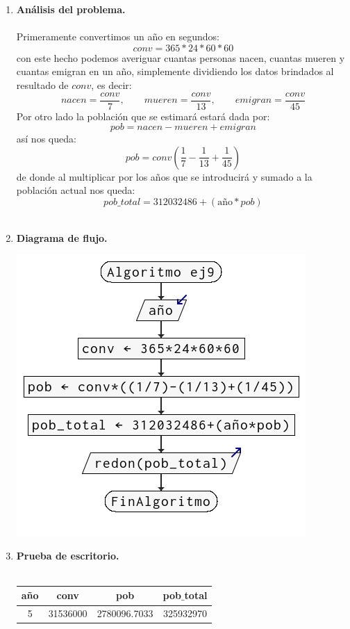 \begin{enumerate}
\begin{enumerate}[\bfseries a)]
    \item \textbf{Análisis del problema.}\\\\
	Primeramente convertimos un año en segundos:
	$$conv=365*24*60*60$$
	con este hecho podemos averiguar cuantas personas nacen, cuantas mueren y cuantas emigran en un año, simplemente dividiendo los datos brindados al resultado de $conv$, es decir:
	$$nacen = \dfrac{conv}{7}, \qquad mueren = \dfrac{conv}{13},\qquad emigran = \dfrac{conv}{45}$$
	Por otro lado la población que se estimará estará dada por:
	$$pob = nacen - mueren + emigran$$
	así nos queda: $$pob = conv\left(\dfrac{1}{7}-\dfrac{1}{13}+\dfrac{1}{45}\right)$$
	de donde al multiplicar por los años que se introducirá y sumado a la población actual nos queda:
	$$pob\_total = 312032486 + (\mbox{año}*pob)$$\\

    \item \textbf{Diagrama de flujo.}\\
	\begin{center}
	    \includegraphics[scale=.9]{imagenes/tarea2/ej9df.png}
	\end{center}
	\vspace{1cm}

    \item \textbf{Prueba de escritorio.}\\\\
	\begin{center}
	    \begin{tabular}{c|c|c|c}
		año&conv&pob&pob$\_$total\\
		\hline
		5&31536000&2780096.7033&325932970\\
	    \end{tabular}
	\end{center}
	\vspace{1cm}
    

\end{enumerate}
\end{enumerate}
